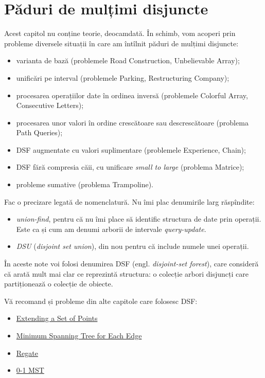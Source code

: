\documentclass[../main.tex]{subfiles}
\begin{document}
\chapter{Păduri de mulțimi disjuncte}

Acest capitol nu conține teorie, deocamdată. În schimb, vom acoperi prin probleme diversele situații în care am întîlnit păduri de mulțimi disjuncte:

\begin{itemize}
  \item varianta de bază (problemele Road Construction, Unbelievable Array);
  \item unificări pe interval (problemele Parking, Restructuring Company);
  \item procesarea operațiilor date în ordinea inversă (problemele Colorful Array, Consecutive Letters);
  \item procesarea unor valori în ordine crescătoare sau descrescătoare (problema Path Queries);
  \item DSF augmentate cu valori suplimentare (problemele Experience, Chain);
  \item DSF fără compresia căii, cu unificare \textit{small to large} (problema Matrice);
  \item probleme sumative (problema Trampoline).
\end{itemize}

Fac o precizare legată de nomenclatură. Nu îmi plac denumirile larg răspîndite:

\begin{itemize}
  \item \textit{union-find}, pentru că nu îmi place să identific structura de date prin operații. Este ca și cum am denumi arborii de intervale \textit{query-update}.
  \item \textit{DSU} (\textit{disjoint set union}), din nou pentru că include numele unei operații.
\end{itemize}

În aceste note voi folosi denumirea DSF (engl. \textit{disjoint-set forest}), care consideră că arată mult mai clar ce reprezintă structura: o colecție arbori disjuncți care partiționează o colecție de obiecte.

Vă recomand și probleme din alte capitole care folosesc DSF:

\begin{itemize}
  \item \hyperref[problem:extending-a-set-of-points]{Extending a Set of Points}
  \item \hyperref[problem:mst-for-each-edge]{Minimum Spanning Tree for Each Edge}
  \item \hyperref[problem:regate]{Regate}
  \item \hyperref[problem:0-1-mst]{0-1 MST}
\end{itemize}
\end{document}
